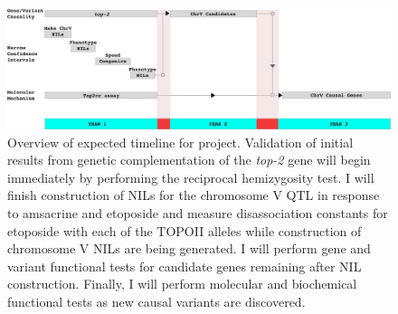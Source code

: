\documentclass[12pt]{article}
\begin{document}
\begin{figure}[h]
\renewcommand{\thefigure}{A.\arabic{figure}}
\centering
\includegraphics[scale=0.12]{Figures/Appendix_Timeline.pdf}
\vspace{10pt}
\caption[Project Timeline]{Overview of expected timeline for project. Validation of initial results from genetic complementation of the {\it top-2} gene will begin immediately by performing the reciprocal hemizygosity test. I will finish construction of NILs for the chromosome V QTL in response to amsacrine and etoposide and measure disassociation constants for etoposide with each of the TOPOII alleles while construction of chromosome V NILs are being generated. I will perform gene and variant functional tests for candidate genes remaining after NIL construction. Finally, I will perform molecular and biochemical functional tests as new causal variants are discovered.}
\label{Timeline}
\end{figure}
\end{document}
